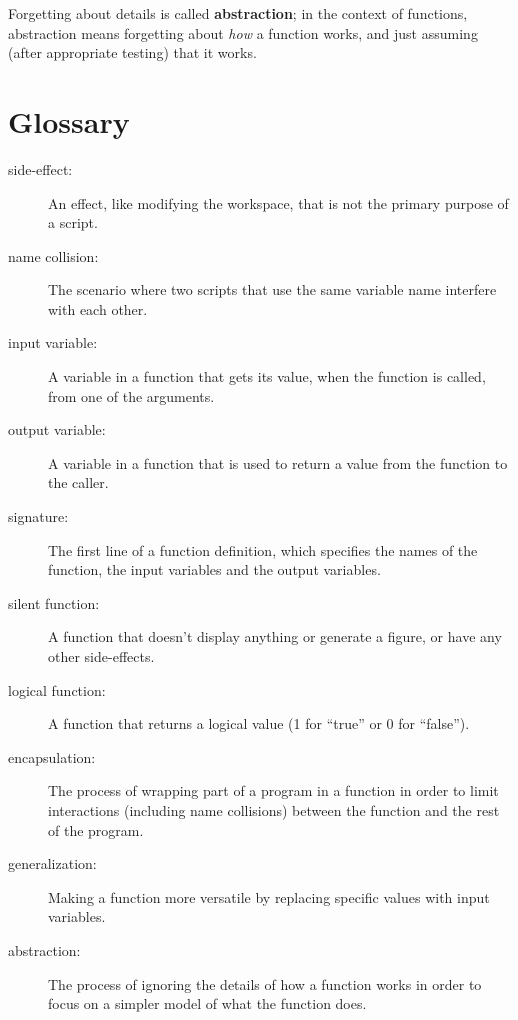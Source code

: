 \documentclass{book}
\begin{document}
Forgetting about details is called {\bf abstraction}; in the context
of functions, abstraction means forgetting about {\em how} a function
works, and just assuming (after appropriate testing) that it works.


\section{Glossary}

\begin{description}

\item[side-effect:] An effect, like modifying the workspace, that
is not the primary purpose of a script.

\item[name collision:] The scenario where two scripts that use the
same variable name interfere with each other.

\item[input variable:] A variable in a function that gets its value,
when the function is called, from one of the arguments.

\item[output variable:] A variable in a function that is used to
return a value from the function to the caller.

\item[signature:] The first line of a function definition, which
specifies the names of the function, the input variables and the
output variables.

\item[silent function:] A function that doesn't display anything
or generate a figure, or have any other side-effects.

\item[logical function:] A function that returns a logical value
(1 for ``true'' or 0 for ``false'').

\item[encapsulation:] The process of wrapping part of a program in
a function in order to limit interactions (including name collisions)
between the function and the rest of the program.

\item[generalization:] Making a function more versatile by replacing
specific values with input variables.

\item[abstraction:] The process of ignoring the details of how
a function works in order to focus on a simpler model of what the
function does.

\end{description}
\end{document}
